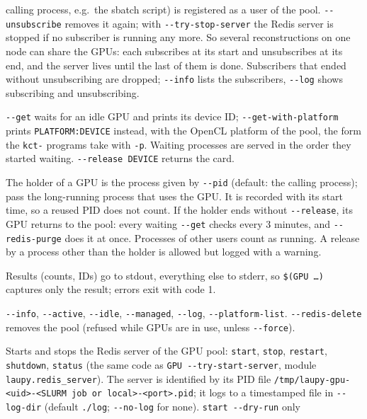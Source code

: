 \documentclass[11pt,a4paper]{article}
\newcommand{\cmd}[1]{\texttt{#1}}
\begin{document}
\begin{description}[style=nextline,leftmargin=1.5em]
\begin{description}[style=nextline,leftmargin=1.5em,itemsep=2pt]
        calling process, e.g.\ the sbatch script) is registered as a user of the pool.
        \cmd{-{}-unsubscribe} removes it again; with \cmd{-{}-try-stop-server} the Redis server is
        stopped if no subscriber is running any more. So several reconstructions on one node can
        share the GPUs: each subscribes at its start and unsubscribes at its end, and the server lives
        until the last of them is done. Subscribers that ended without unsubscribing are dropped;
        \cmd{-{}-info} lists the subscribers, \cmd{-{}-log} shows subscribing and unsubscribing.
      \item[Getting a card] \cmd{-{}-get} waits for an idle GPU and prints its device ID;
        \cmd{-{}-get-with-platform} prints \cmd{PLATFORM:DEVICE} instead, with the OpenCL platform
        of the pool, the form the \cmd{kct-} programs take with \cmd{-p}. Waiting processes are served
        in the order they started waiting. \cmd{-{}-release DEVICE} returns the card.
      \item[Holders] The holder of a GPU is the process given by \cmd{-{}-pid} (default: the calling
        process); pass the long-running process that uses the GPU. It is recorded with its start
        time, so a reused PID does not count. If the holder ends without \cmd{-{}-release}, its GPU
        returns to the pool: every waiting \cmd{-{}-get} checks every 3 minutes, and
        \cmd{-{}-redis-purge} does it at once. Processes of other users count as running. A release
        by a process other than the holder is allowed but logged with a warning.
      \item[Output] Results (counts, IDs) go to stdout, everything else to stderr, so
        \cmd{\$(GPU \ldots)} captures only the result; errors exit with code 1.
      \item[Information] \cmd{-{}-info}, \cmd{-{}-active}, \cmd{-{}-idle}, \cmd{-{}-managed},
        \cmd{-{}-log}, \cmd{-{}-platform-list}. \cmd{-{}-redis-delete} removes the pool (refused while
        GPUs are in use, unless \cmd{-{}-force}).
    \end{description}
  \item[\cmd{REDIS}] Starts and stops the Redis server of the GPU pool: \cmd{start}, \cmd{stop},
    \cmd{restart}, \cmd{shutdown}, \cmd{status} (the same code as \cmd{GPU -{}-try-start-server},
    module \cmd{laupy.redis\_server}). The server is identified by its PID file
    \cmd{/tmp/laupy-gpu-<uid>-<SLURM job or local>-<port>.pid}; it logs to a timestamped file in
    \cmd{-{}-log-dir} (default \cmd{./log}; \cmd{-{}-no-log} for none). \cmd{start -{}-dry-run} only

\end{description}
\end{document}
